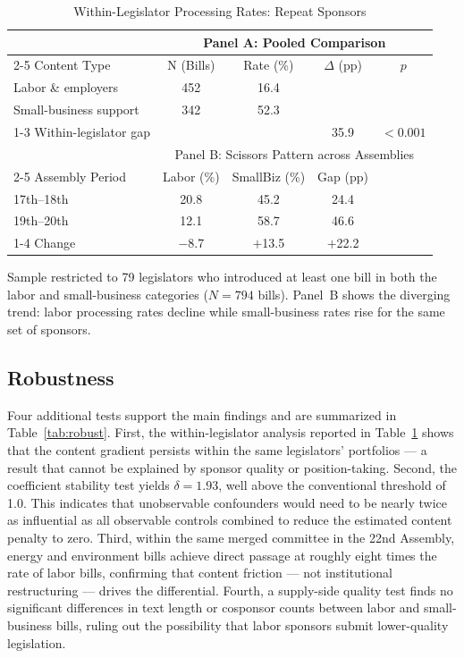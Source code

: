 \documentclass[11pt]{article}
\begin{document}
\begin{table}[htbp]
\centering
\begin{threeparttable}
\caption{Within-Legislator Processing Rates: Repeat Sponsors}
\label{tab:within}
\begin{tabular}{lcccc}
\toprule
& \multicolumn{4}{c}{Panel A: Pooled Comparison} \\
\cmidrule(lr){2-5}
Content Type & N (Bills) & Rate (\%) & $\Delta$ (pp) & $p$ \\
\midrule
Labor \& employers       & 452 & 16.4 &       & \\
Small-business support   & 342 & 52.3 &       & \\
\cmidrule(lr){1-3}
Within-legislator gap    &     &      & 35.9  & $< 0.001$ \\
\midrule
& \multicolumn{4}{c}{Panel B: Scissors Pattern across Assemblies} \\
\cmidrule(lr){2-5}
Assembly Period & Labor (\%) & SmallBiz (\%) & Gap (pp) & \\
\midrule
17th--18th       & 20.8 & 45.2 & 24.4 & \\
19th--20th       & 12.1 & 58.7 & 46.6 & \\
\cmidrule(lr){1-4}
Change           & $-$8.7 & $+$13.5 & $+$22.2 & \\
\bottomrule
\end{tabular}
\begin{tablenotes}
\footnotesize
\item Sample restricted to 79 legislators who introduced at least one bill in both the labor and small-business categories ($N = 794$ bills). Panel~B shows the diverging trend: labor processing rates decline while small-business rates rise for the same set of sponsors.
\end{tablenotes}
\end{threeparttable}
\end{table}

\subsection{Robustness}

Four additional tests support the main findings and are summarized in Table~\ref{tab:robust}. First, the within-legislator analysis reported in Table~\ref{tab:within} shows that the content gradient persists within the same legislators' portfolios --- a result that cannot be explained by sponsor quality or position-taking. Second, the \citet{oster2019} coefficient stability test yields $\delta = 1.93$, well above the conventional threshold of 1.0. This indicates that unobservable confounders would need to be nearly twice as influential as all observable controls combined to reduce the estimated content penalty to zero. Third, within the same merged committee in the 22nd Assembly, energy and environment bills achieve direct passage at roughly eight times the rate of labor bills, confirming that content friction --- not institutional restructuring --- drives the differential. Fourth, a supply-side quality test finds no significant differences in text length or cosponsor counts between labor and small-business bills, ruling out the possibility that labor sponsors submit lower-quality legislation.
\end{document}
